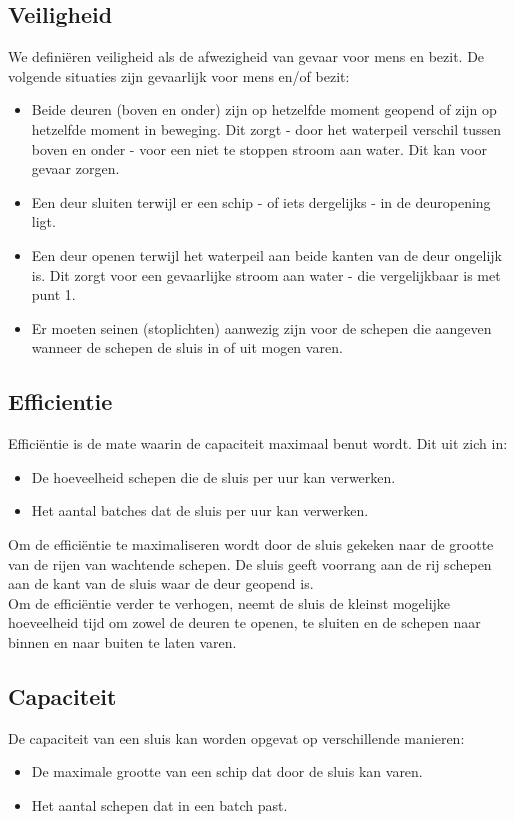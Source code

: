 \documentclass{article} %
\begin{document}
\subsection{Veiligheid}
We definiëren veiligheid als de afwezigheid van gevaar voor mens en bezit. De volgende situaties zijn gevaarlijk voor mens en/of bezit:
\begin{itemize}
    \item Beide deuren (boven en onder) zijn op hetzelfde moment geopend of zijn op hetzelfde moment in beweging. Dit zorgt - door het waterpeil verschil tussen boven en onder - voor een niet te stoppen stroom aan water. Dit kan voor gevaar zorgen.
    \item Een deur sluiten terwijl er een schip - of iets dergelijks - in de deuropening ligt.
    \item Een deur openen terwijl het waterpeil aan beide kanten van de deur ongelijk is. Dit zorgt voor een gevaarlijke stroom aan water - die vergelijkbaar is met punt 1.
    \item Er moeten seinen (stoplichten) aanwezig zijn voor de schepen die aangeven wanneer de schepen de sluis in of uit mogen varen.
\end{itemize}

\subsection{Efficientie}
Efficiëntie is de mate waarin de capaciteit maximaal benut wordt. Dit uit zich in:
\begin{itemize}
    \item De hoeveelheid schepen die de sluis per uur kan verwerken.
    \item Het aantal batches dat de sluis per uur kan verwerken.
\end{itemize}

Om de efficiëntie te maximaliseren wordt door de sluis gekeken naar de grootte van de rijen van wachtende schepen. De sluis geeft voorrang aan de rij schepen aan de kant van de sluis waar de deur geopend is. \\
Om de efficiëntie verder te verhogen, neemt de sluis de kleinst mogelijke hoeveelheid tijd om zowel de deuren te openen, te sluiten en de schepen naar binnen en naar buiten te laten varen.


\subsection{Capaciteit}
De capaciteit van een sluis kan worden opgevat op verschillende manieren:
\begin{itemize}
    \item De maximale grootte van een schip dat door de sluis kan varen.
    \item Het aantal schepen dat in een batch past.
\end{itemize}
\end{document}
